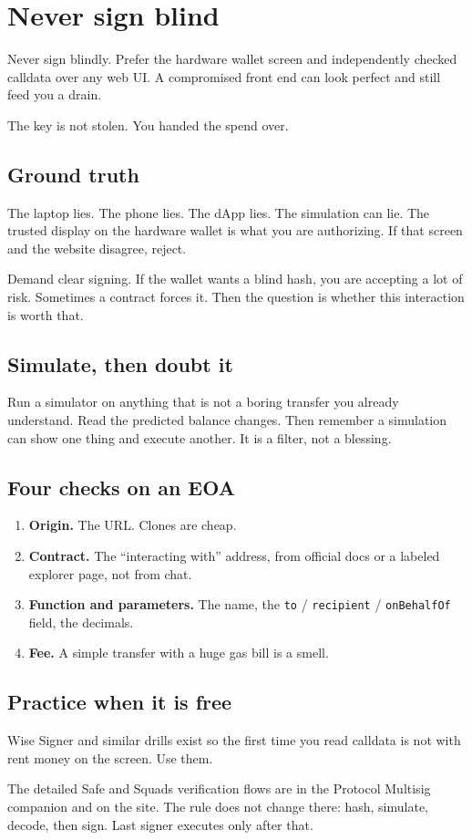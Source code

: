 \chapter{Never sign blind}

Never sign blindly. Prefer the hardware wallet screen
and independently checked calldata over any web UI.
A compromised front end can look perfect and still feed
you a drain.

The key is not stolen. You handed the spend over.

\section{Ground truth}

The laptop lies. The phone lies. The dApp lies. The
simulation can lie. The trusted display on the hardware
wallet is what you are authorizing. If that screen and
the website disagree, reject.

Demand clear signing. If the wallet wants a blind hash,
you are accepting a lot of risk. Sometimes a contract
forces it. Then the question is whether this interaction
is worth that.

\section{Simulate, then doubt it}

Run a simulator on anything that is not a boring
transfer you already understand. Read the predicted
balance changes. Then remember a simulation can show one
thing and execute another. It is a filter, not a
blessing.

\section{Four checks on an EOA}

\begin{enumerate}
  \item \textbf{Origin.} The URL. Clones are cheap.
  \item \textbf{Contract.} The ``interacting with''
  address, from official docs or a labeled explorer
  page, not from chat.
  \item \textbf{Function and parameters.} The name, the
  \texttt{to} / \texttt{recipient} / \texttt{onBehalfOf}
  field, the decimals.
  \item \textbf{Fee.} A simple transfer with a huge gas
  bill is a smell.
\end{enumerate}

\section{Practice when it is free}

Wise Signer and similar drills exist so the first time
you read calldata is not with rent money on the screen.
Use them.

The detailed Safe and Squads verification flows are in
the Protocol Multisig companion and on the site. The
rule does not change there: hash, simulate, decode, then
sign. Last signer executes only after that.
